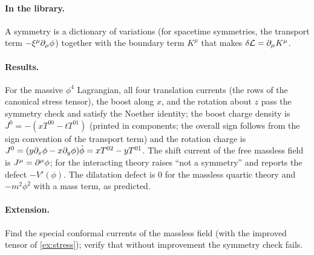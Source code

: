 \paragraph{In the library.} A symmetry is a dictionary of variations (for spacetime symmetries, the transport term $-\xi^\mu\partial_\mu\phi$) together with the boundary term $K^\mu$ that makes $\delta\mathcal L=\partial_\mu K^\mu$.


\paragraph{Results.} For the massive $\phi^4$ Lagrangian, all four translation currents (the rows of the canonical stress tensor), the boost along $x$, and the rotation about $z$ pass the symmetry check and satisfy the Noether identity; the boost charge density is $J^0=-(xT^{00}-tT^{01})$ (printed in components; the overall sign follows from the sign convention of the transport term) and the rotation charge is $J^0=(y\partial_x\phi-x\partial_y\phi)\dot\phi=xT^{02}-yT^{01}$. The shift current of the free massless field is $J^\mu=\partial^\mu\phi$; for the interacting theory  raises ``not a symmetry'' and reports the defect $-V'(\phi)$. The dilatation defect is $0$ for the massless quartic theory and $-m^2\phi^2$ with a mass term, as predicted.

\paragraph{Extension.} Find the special conformal currents of the massless field (with the improved tensor of \cref{ex:stress}); verify that without improvement the symmetry check fails.
